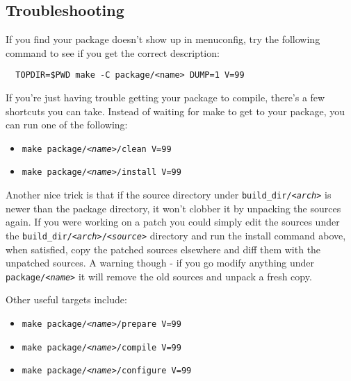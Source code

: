 \subsection{Troubleshooting}

If you find your package doesn't show up in menuconfig, try the following command to
see if you get the correct description:

\begin{Verbatim}
  TOPDIR=$PWD make -C package/<name> DUMP=1 V=99
\end{Verbatim}

If you're just having trouble getting your package to compile, there's a few
shortcuts you can take. Instead of waiting for make to get to your package, you can
run one of the following:

\begin{itemize}
    \item \texttt{make package/\textit{<name>}/clean V=99}
    \item \texttt{make package/\textit{<name>}/install V=99}
\end{itemize}

Another nice trick is that if the source directory under \texttt{build\_dir/\textit{<arch>}}
is newer than the package directory, it won't clobber it by unpacking the sources again.
If you were working on a patch you could simply edit the sources under the
\texttt{build\_dir/\textit{<arch>}/\textit{<source>}} directory and run the install command above,
when satisfied, copy the patched sources elsewhere and diff them with the unpatched
sources. A warning though - if you go modify anything under \texttt{package/\textit{<name>}}
it will remove the old sources and unpack a fresh copy.

Other useful targets include:

\begin{itemize}
    \item \texttt{make package/\textit{<name>}/prepare V=99}
    \item \texttt{make package/\textit{<name>}/compile V=99}
    \item \texttt{make package/\textit{<name>}/configure V=99}
\end{itemize}

